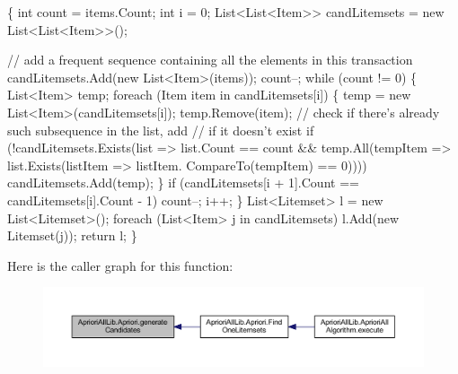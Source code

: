\begin{DoxyCode}
        \{
            \textcolor{keywordtype}{int} count = items.Count;
            \textcolor{keywordtype}{int} i = 0;
            List<List<Item>> candLitemsets = \textcolor{keyword}{new} List<List<Item>>();

            \textcolor{comment}{// add a frequent sequence containing all the elements in this
       transaction}
            candLitemsets.Add(\textcolor{keyword}{new} List<Item>(items));
            count--;
            \textcolor{keywordflow}{while} (count != 0)
            \{
                List<Item> temp;
                \textcolor{keywordflow}{foreach} (Item item \textcolor{keywordflow}{in} candLitemsets[i])
                \{
                    temp = \textcolor{keyword}{new} List<Item>(candLitemsets[i]);
                    temp.Remove(item);
                    \textcolor{comment}{// check if there's already such subsequence in the list,
       add}
                    \textcolor{comment}{// if it doesn't exist}
                    \textcolor{keywordflow}{if} (!candLitemsets.Exists(list => list.Count == count &&
                        temp.All(tempItem => list.Exists(listItem => listItem.
      CompareTo(tempItem) == 0))))
                        candLitemsets.Add(temp);
                \}
                \textcolor{keywordflow}{if} (candLitemsets[i + 1].Count == candLitemsets[i].Count - 1)
                    count--;
                i++;
            \}
            List<Litemset> l = \textcolor{keyword}{new} List<Litemset>();
            \textcolor{keywordflow}{foreach} (List<Item> j \textcolor{keywordflow}{in} candLitemsets)
                l.Add(\textcolor{keyword}{new} Litemset(j));
            \textcolor{keywordflow}{return} l;
        \}
\end{DoxyCode}


Here is the caller graph for this function\-:
\nopagebreak
\begin{figure}[H]
\begin{center}
\leavevmode
\includegraphics[width=350pt]{class_apriori_all_lib_1_1_apriori_a79d720678f873cfb665fe6cbf4bf32ae_icgraph}
\end{center}
\end{figure}




